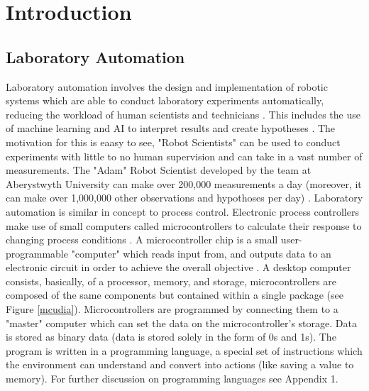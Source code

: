 \documentclass{report}
\begin{document}
	\newpage
	\setcounter{page}{1}
	
	\chapter*{Introduction}



	\section{Laboratory Automation}
	Laboratory automation involves the design and implementation of robotic systems which are able to conduct laboratory experiments automatically, reducing the workload of human scientists and technicians \cite{backwhatisauto}. This includes the use of machine learning and AI to interpret results and create hypotheses \cite{backlitrevai, backbaconauto, backlabauto}. The motivation for this is eaasy to see, "Robot Scientists" can be used to conduct experiments with little to no human supervision and can take in a vast number of measurements. The "Adam" Robot Scientist developed by the team at Aberystwyth University can make over 200,000 measurements a day (moreover, it can make over 1,000,000 other observations and hypothoses per day)  \cite{backontorobsci}.\newline \newline \noindent
	Laboratory automation is similar in concept to process control. Electronic process controllers make use of small computers called microcontrollers to calculate their response to changing process conditions \cite{backprocautotheory}. A microcontroller chip is a small user-programmable "computer" which reads input from, and outputs data to an electronic circuit in order to achieve the overall objective \cite{backwhatismc}. A desktop computer consists, basically, of a processor, memory, and storage, microcontrollers are composed of the same components but contained within a single package (see Figure \ref{mcudia}). Microcontrollers are programmed by connecting them to a "master" computer which can set the data on the microcontroller's storage. Data is stored as binary data (data is stored solely in the form of 0s and 1s). The program is written in a programming language, a special set of instructions which the environment can understand and convert into actions (like saving a value to memory). For further discussion on programming languages see Appendix 1.
\end{document}
